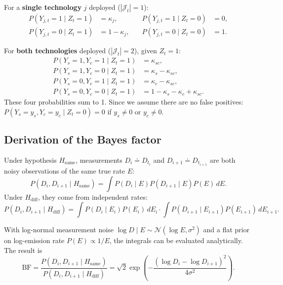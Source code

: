 \documentclass[11pt]{article}
\begin{document}
For a \textbf{single technology} $j$ deployed ($|\mathcal{J}_t| = 1$):
\begin{align}
    P(Y_{j,t} = 1 \mid Z_t = 1) &= \kappa_j, &\quad P(Y_{j,t} = 1 \mid Z_t = 0) &= 0, \\
    P(Y_{j,t} = 0 \mid Z_t = 1) &= 1 - \kappa_j, &\quad P(Y_{j,t} = 0 \mid Z_t = 0) &= 1.
\end{align}

For \textbf{both technologies} deployed ($|\mathcal{J}_t| = 2$), given $Z_t = 1$:
\begin{align}
    P(Y_s{=}1, Y_c{=}1 \mid Z_t{=}1) &= \kappa_{sc}, \\
    P(Y_s{=}1, Y_c{=}0 \mid Z_t{=}1) &= \kappa_s - \kappa_{sc}, \\
    P(Y_s{=}0, Y_c{=}1 \mid Z_t{=}1) &= \kappa_c - \kappa_{sc}, \\
    P(Y_s{=}0, Y_c{=}0 \mid Z_t{=}1) &= 1 - \kappa_s - \kappa_c + \kappa_{sc}.
\end{align}
These four probabilities sum to 1. Since we assume there are no false positives: $P(Y_s{=}y_s, Y_c{=}y_c \mid Z_t{=}0) = 0$ if $y_s\neq0$ or $y_c\neq 0$.


\subsection{Derivation of the Bayes factor}
\label{sec:bayes_factor}

Under hypothesis $H_{\text{same}}$, measurements $D_i\doteq D_{t_i}$ and $D_{i+1}\doteq D_{t_{i+1}}$ are both noisy observations of the same true rate $E$:
\begin{equation}
    P(D_i, D_{i+1} \mid H_{\text{same}}) = \int P(D_i \mid E) P(D_{i+1} \mid E) P(E) \, dE.
\end{equation}
Under $H_{\text{diff}}$, they come from independent rates:
\begin{equation}
    P(D_i, D_{i+1} \mid H_{\text{diff}}) = \int P(D_i \mid E_i) P(E_i) \, dE_i \cdot \int P(D_{i+1} \mid E_{i+1}) P(E_{i+1}) \, dE_{i+1}.
\end{equation}

With log-normal measurement noise $\log D \mid E \sim \mathcal{N}(\log E, \sigma^2)$ and a flat prior on log-emission rate $P(E) \propto 1/E$, the integrals can be evaluated analytically. The result is
\begin{equation}
    \text{BF} = \frac{P(D_i, D_{i+1} \mid H_{\text{same}})}{P(D_i, D_{i+1} \mid H_{\text{diff}})} = \sqrt{2} \exp\left(-\frac{(\log D_i - \log D_{i+1})^2}{4\sigma^2}\right).
\end{equation}
\end{document}
